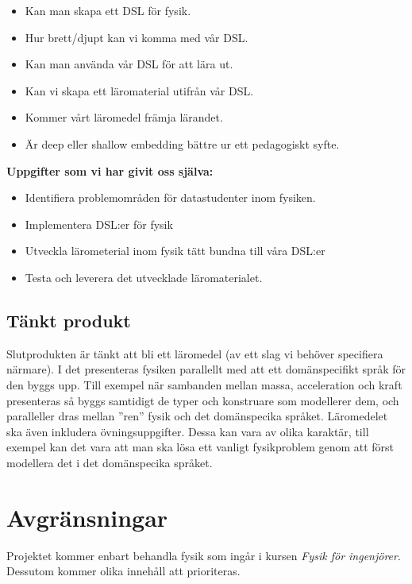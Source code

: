 \documentclass[12pt,a4paper]{scrartcl}
\begin{document}
\begin{itemize}
    \item Kan man skapa ett DSL för fysik.
    \item Hur brett/djupt kan vi komma med vår DSL.
    \item Kan man använda vår DSL för att lära ut.
    \item Kan vi skapa ett läromaterial utifrån vår DSL.
    \item Kommer vårt läromedel främja lärandet.
    \item Är deep eller shallow embedding bättre ur ett pedagogiskt syfte.
\end{itemize}

\textbf{Uppgifter som vi har givit oss själva:}

\begin{itemize}
    \item Identifiera problemområden för datastudenter inom fysiken.
    \item Implementera DSL:er för fysik
    \item Utveckla lärometerial inom fysik tätt bundna till våra DSL:er
    \item Testa och leverera det utvecklade läromaterialet.
\end{itemize}

\subsection{Tänkt produkt}

Slutprodukten är tänkt att bli ett läromedel (av ett slag vi behöver specifiera närmare). I det presenteras fysiken parallellt med att ett domänspecifikt språk för den byggs upp. Till exempel när sambanden mellan massa, acceleration och kraft presenteras så byggs samtidigt de typer och konstruare som modellerer dem, och paralleller dras mellan ''ren'' fysik och det domänspecika språket. Läromedelet ska även inkludera övningsuppgifter. Dessa kan vara av olika karaktär, till exempel kan det vara att man ska lösa ett vanligt fysikproblem genom att först modellera det i det domänspecika språket.

\section{Avgränsningar}

Projektet kommer enbart behandla fysik som ingår i kursen \textit{Fysik för ingenjörer}. Dessutom kommer olika innehåll att prioriteras.
\end{document}
